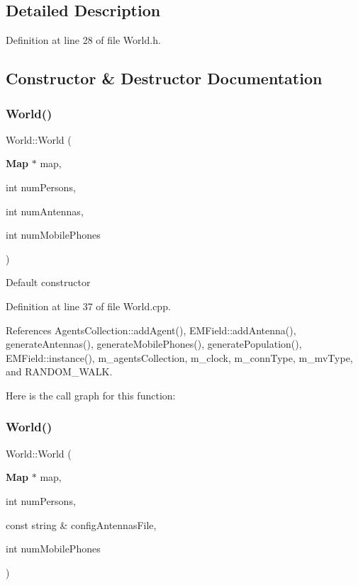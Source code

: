\subsection{Detailed Description}


Definition at line 28 of file World.\+h.



\subsection{Constructor \& Destructor Documentation}
\mbox{\label{class_world_a94871f094bb3eabb67f5bd1b10396832}} 
\subsubsection{World()\hspace{0.1cm}{\footnotesize\ttfamily [1/3]}}
{\footnotesize\ttfamily World\+::\+World (\begin{DoxyParamCaption}\item[{\textbf{ Map} $\ast$}]{map,  }\item[{int}]{num\+Persons,  }\item[{int}]{num\+Antennas,  }\item[{int}]{num\+Mobile\+Phones }\end{DoxyParamCaption})}

Default constructor 

Definition at line 37 of file World.\+cpp.



References Agents\+Collection\+::add\+Agent(), E\+M\+Field\+::add\+Antenna(), generate\+Antennas(), generate\+Mobile\+Phones(), generate\+Population(), E\+M\+Field\+::instance(), m\+\_\+agents\+Collection, m\+\_\+clock, m\+\_\+conn\+Type, m\+\_\+mv\+Type, and R\+A\+N\+D\+O\+M\+\_\+\+W\+A\+LK.

Here is the call graph for this function\+:
\mbox{\label{class_world_a5a02572c10d750037a8c604a7d806550}} 
\subsubsection{World()\hspace{0.1cm}{\footnotesize\ttfamily [2/3]}}
{\footnotesize\ttfamily World\+::\+World (\begin{DoxyParamCaption}\item[{\textbf{ Map} $\ast$}]{map,  }\item[{int}]{num\+Persons,  }\item[{const string \&}]{config\+Antennas\+File,  }\item[{int}]{num\+Mobile\+Phones }\end{DoxyParamCaption})\hspace{0.3cm}{\ttfamily [noexcept]}}



